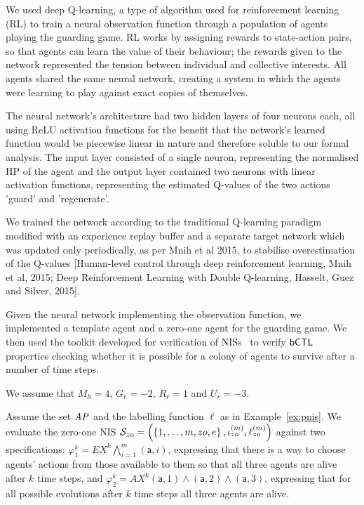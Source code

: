 We used deep Q-learning, a type of algorithm used for reinforcement learning (RL) to train a neural observation function through a population of agents playing the guarding game. RL works by assigning rewards to state-action pairs, so that agents can learn the value of their behaviour; the rewards given to the network represented the tension between individual and collective interests. All agents shared the same neural network, creating a system in which the agents were learning to play against exact copies of themselves. 

The neural network's architecture had two hidden layers of four neurons each, all using ReLU activation functions for the benefit that the network's learned function would be piecewise linear in nature and therefore soluble to our formal analysis. The input layer consisted of a single neuron, representing the normalised HP of the agent and the output layer contained two neurons with linear activation functions, representing the estimated Q-values of the two actions 'guard' and 'regenerate'. 

We trained the network according to the traditional Q-learning paradigm modified with an experience replay buffer and a separate target network which was updated only periodically, as per Mnih et al 2015, to stabilise overestimation of the Q-values [Human-level control through deep reinforcement learning, Mnih et al, 2015; Deep Reinforcement Learning with Double Q-learning, Hasselt, Guez and Silver, 2015]. 



Given the neural network implementing the observation function, we 
implemented a template agent and a zero-one agent for the guarding game. We
then used the \venmas toolkit developed for verification of
NISs~\cite{Akintunde+20b} to verify $\sf{bCTL}$ properties checking whether it is
possible for a colony of agents to survive after a number of time steps.

We assume that $M_h = 4$, $G_r = -2$, $R_r = 1$ and $U_r = -3$. 

Assume the set $\it{AP}$ and the labelling function $\ell$ as in
Example~\ref{ex:pnis}. We evaluate the zero-one NIS
$\mathcal S_{zo} = \left ( \left \{ 1,\ldots,m,zo,e \right \}, \iota^{({m})}_{zo}, \ell^{(m)}_{zo} \right )$
against two specifications:
$\varphi^k_1 = EX^k \bigwedge_{i=1}^m(\mathsf{a},i)$,
expressing that there is a way to choose agents' actions from those available
to them so that all three agents are alive after $k$ time steps, and
$\varphi^k_2 = AX^k (\mathsf{a},1) \land (\mathsf{a},2) \land (\mathsf{a},3)$,
expressing that for all possible evolutions after $k$ time steps all three
agents are alive.

